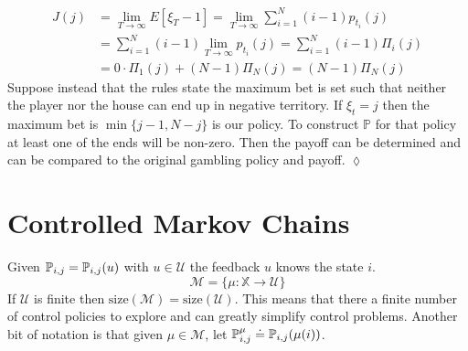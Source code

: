 \documentclass[lecture,12pt,]{pcms-l}
\begin{document}
\begin{example}
\begin{align*}
J(j) &= \lim_{T\to\infty}E[\xi_T-1] = \lim_{T\to\infty}\sum_{i=1}^N (i-1)p_{t_i}(j) \\
&= \sum_{i=1}^N (i-1)\lim_{T\to\infty} p_{t_i}(j) = \sum_{i=1}^N (i-1) \Pi_i(j) \\
&= 0\cdot \Pi_1(j) + (N-1)\Pi_N(j) = (N-1)\Pi_N(j)
\end{align*}
Suppose instead that the rules state the maximum bet is set such that neither the player nor the house can end up in negative territory. If $\xi_t=j$ then the maximum bet is $\min\{j-1,N-j\}$ is our policy. To construct $\mathbb{P}$ for that policy at least one of the ends will be non-zero. Then the payoff can be determined and can be compared to the original gambling policy and payoff.
$\lozenge$
\end{example}

\section{Controlled Markov Chains}
Given $\mathbb{P}_{i,j}=\mathbb{P}_{i,j}(u)$ with $u\in\mathcal{U}$ the feedback $u$ knows the state $i$.
$$\mathcal{M}=\{\mu:\mathbb{X}\rightarrow\mathcal{U}\}$$
If $\mathcal{U}$ is finite then $\text{size}(\mathcal{M})=\text{size}(\mathcal{U})$. This means that there a finite number of control policies to explore and can greatly simplify control problems. Another bit of notation is that given $\mu\in\mathcal{M}$, let $\mathbb{P}_{i,j}^\mu \doteq \mathbb{P}_{i,j}(\mu(i))$.
\end{document}
